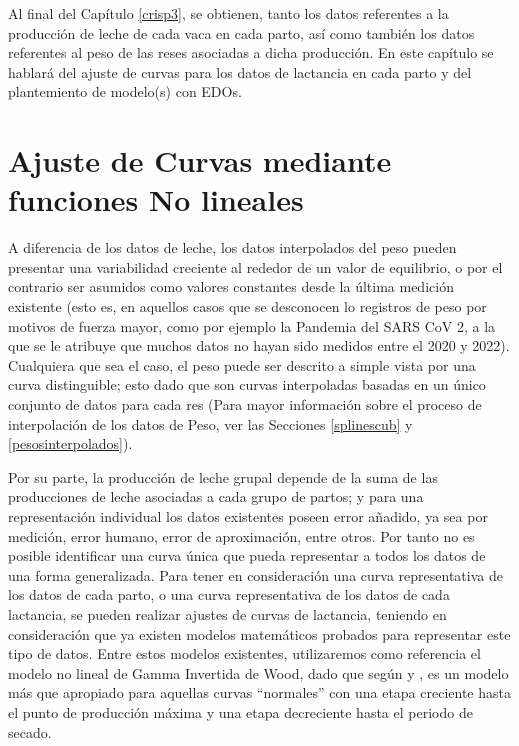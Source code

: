 
Al final del Capítulo \ref{crisp3}, se obtienen, tanto los datos referentes a la producción de leche de cada vaca en cada parto, así como también los datos referentes al peso de las reses asociadas a dicha producción. En este capítulo se hablará del ajuste de curvas para los datos de lactancia en cada parto y del plantemiento de modelo(s) con EDOs.

\section{Ajuste de Curvas mediante funciones No lineales}\label{ajustenonlin}

A diferencia de los datos de leche, los datos interpolados del peso pueden presentar una variabilidad  creciente al rededor de un valor de equilibrio, o por el contrario ser asumidos como valores constantes desde la última medición existente (esto es, en aquellos casos que se desconocen lo registros de peso por motivos de fuerza mayor, como por ejemplo la Pandemia del SARS CoV 2, a la que se le atribuye que muchos datos no hayan sido medidos entre el 2020 y 2022). Cualquiera que sea el caso, el peso puede ser descrito a simple vista por una curva distinguible; esto dado que son curvas interpoladas basadas en un único conjunto de datos para cada res (Para mayor información sobre el proceso de interpolación de los datos de Peso, ver las Secciones \ref{splinescub} y \ref{pesosinterpolados}).

Por su parte, la producción de leche grupal depende de la suma de las producciones de leche asociadas a cada grupo de partos; y para una representación individual los datos existentes poseen error añadido, ya sea por medición, error humano, error de aproximación, entre otros. Por tanto no es posible identificar una curva única que pueda representar a todos los datos de una forma generalizada. Para tener en consideración una curva representativa de los datos de cada parto, o una curva representativa de los datos de cada lactancia, se pueden realizar ajustes de curvas de lactancia, teniendo en consideración que ya existen modelos matemáticos probados para representar este tipo de datos. Entre estos modelos existentes, utilizaremos como referencia el modelo no lineal de Gamma Invertida de Wood, dado que según \cite{silvestre} y \cite{shanks}, es un modelo más que apropiado para aquellas curvas ``normales'' con una etapa creciente hasta el punto de producción máxima y una etapa decreciente hasta el periodo de secado.

